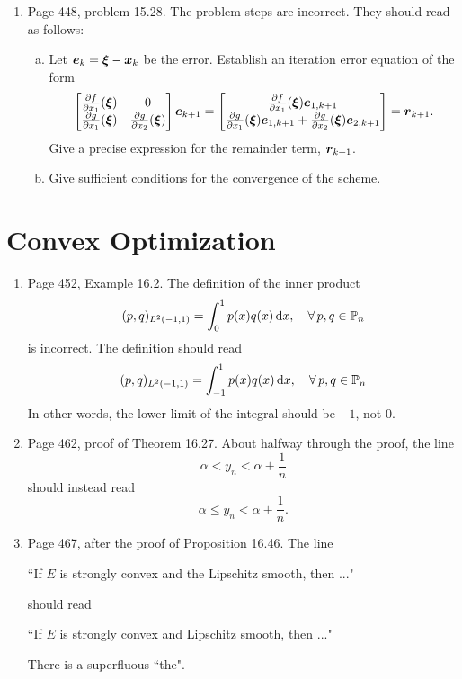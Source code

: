 \documentclass{book}
\begin{document}
\begin{enumerate}
	\item
Page 448, problem 15.28. The problem steps are incorrect. They should read as follows:

  \begin{enumerate}[a)]
    \item Let $\boldsymbol{e}_k = {\boldsymbol \xi} - \boldsymbol{x}_k$ be the error. Establish an iteration error equation of the form
    \[
      \begin{bmatrix}
        \frac{\partial f}{\partial x_1}({\boldsymbol \xi}) & 0 
 \\
        \frac{\partial g}{\partial x_1}({\boldsymbol \xi}) & \frac{\partial g}{\partial x_2}({\boldsymbol \xi})
      \end{bmatrix}
      \boldsymbol{e}_{k+1} =
      \begin{bmatrix}
        \frac{\partial f}{\partial x_1}({\boldsymbol \xi}) \boldsymbol{e}_{1,k+1}   \\
        \frac{\partial g}{\partial x_1}({\boldsymbol \xi}) \boldsymbol{e}_{1,k+1} + \frac{\partial g}{\partial x_2}({\boldsymbol \xi}) \boldsymbol{e}_{2,k+1} 
      \end{bmatrix}
      = \boldsymbol{r}_{k+1}.
    \]
    Give a precise expression for the remainder term, $\boldsymbol{r}_{k+1}$.
    
    \item Give sufficient conditions for the convergence of the scheme.
  \end{enumerate}


	\end{enumerate}
	
	\chapter{Convex Optimization}
	
	\begin{enumerate}
	\item
Page 452, Example 16.2. The definition of the inner product
	\[
(p,q)_{L^2(-1,1)} = \int_{0}^1p(x)q(x)\, \textup{d} x, \quad \forall \, p,q\in{\mathbb P}_n
	\]
is incorrect. The definition should read
	\[
(p,q)_{L^2(-1,1)} = \int_{-1}^1p(x)q(x)\, \textup{d} x, \quad \forall \, p,q\in{\mathbb P}_n
	\]
In other words, the lower limit of the integral should be $-1$, not 0.

	\item
 Page 462, proof of Theorem 16.27. About halfway through the proof, the line
 	\[
 \alpha < y_n < \alpha+\frac{1}{n}	
 	\]
 should instead read
 	\[
 \alpha \le  y_n < \alpha+\frac{1}{n}.	
 	\]
 	
 	\item
 Page 467, after the proof of Proposition 16.46. The line
 	
 \hspace{0.25in}``If $E$ is strongly convex and the Lipschitz smooth, then ..."
 
 should read
 	
 \hspace{0.25in}``If $E$ is strongly convex and Lipschitz smooth, then ..."
 
 There is a superfluous ``the".
 
	\end{enumerate}
	
\end{document}
